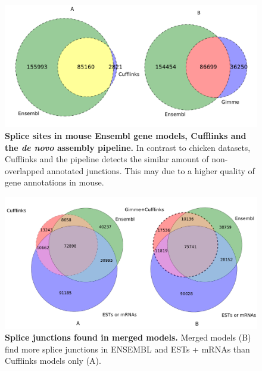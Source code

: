 \documentclass[10pt]{article}
\begin{document}
\begin{figure}[!ht]
\begin{center}
\includegraphics[width=5in]{mouse_venn.pdf}
\end{center}
\caption{
{\bf Splice sites in mouse Ensembl gene models, Cufflinks and the \emph{de novo}
assembly pipeline.} In contrast to chicken datasets, Cufflinks and the pipeline
detects the similar amount of non-overlapped annotated junctions.  This may due
to a higher quality of gene annotations in mouse.  }
\label{mus_venn}
\end{figure}


\begin{figure}[!ht]
\begin{center}
\includegraphics[width=5in]{cuff_gimme_junctions_venn.pdf}
\end{center}
\caption{
    {\bf Splice junctions found in merged models.} Merged models (B) find more
    splice junctions in ENSEMBL and ESTs + mRNAs than Cufflinks models only (A).
}
\label{combined_venn}
\end{figure}

\end{document}
